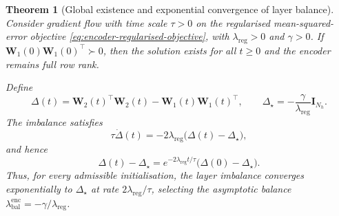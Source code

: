 \documentclass{article} %
\newcommand{\wa}{\mathbf{W}_1}
\newcommand{\wb}{\mathbf{W}_2}
\newtheorem{theorem}{Theorem}[section]
\theoremstyle{remark}
\begin{document}
\begin{theorem}[Global existence and exponential convergence of layer balance]
\label{thm:encoder-balance-dynamics}
Consider gradient flow with time scale $\tau>0$ on the regularised
mean-squared-error objective
\eqref{eq:encoder-regularised-objective}, with
$\lambda_{\mathrm{reg}}>0$ and $\gamma>0$.
If $\wa(0)\wa(0)^\top\succ0$, then the solution exists for all
$t\geq0$ and the encoder remains full row rank.

Define
\[
\Delta(t)=\wb(t)^\top\wb(t)-\wa(t)\wa(t)^\top,
\qquad
\Delta_\star
=
-\frac{\gamma}{\lambda_{\mathrm{reg}}}\mathbf{I}_{N_h}.
\]
The imbalance satisfies
\[
\tau\dot{\Delta}(t)
=
-2\lambda_{\mathrm{reg}}\bigl(\Delta(t)-\Delta_\star\bigr),
\]
and hence
\begin{equation}
\boxed{
\Delta(t)-\Delta_\star
=
e^{-2\lambda_{\mathrm{reg}}t/\tau}
\bigl(\Delta(0)-\Delta_\star\bigr)
}.
\label{eq:encoder-balance-solution} 
\end{equation}
Thus, for every admissible initialisation, the layer imbalance
converges exponentially to $\Delta_\star$ at rate
$2\lambda_{\mathrm{reg}}/\tau$, selecting the asymptotic balance
$\lambda_{\mathrm{bal}}^{\mathrm{enc}}
=-\gamma/\lambda_{\mathrm{reg}}$.
\end{theorem}
\end{document}
